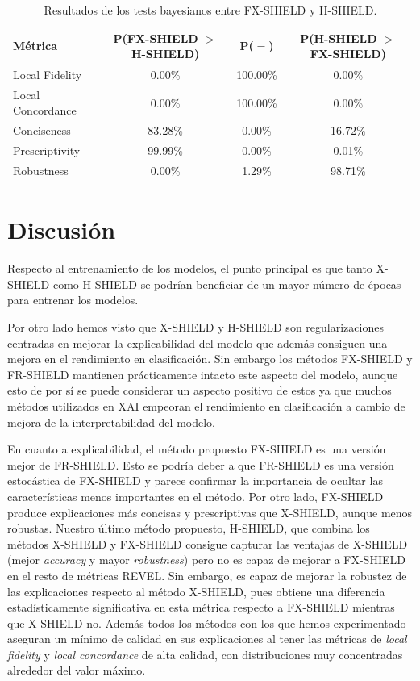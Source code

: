 \begin{table}[ht]
\centering
\begin{tabular}{lccc}
\toprule
\textbf{Métrica} & \textbf{P(FX-SHIELD $>$ H-SHIELD)} & \textbf{P($=$)} & \textbf{P(H-SHIELD $>$ FX-SHIELD)} \\
\midrule
Local Fidelity    & 0.00\%  & 100.00\% & 0.00\%  \\
Local Concordance & 0.00\%  & 100.00\% & 0.00\%  \\
Conciseness       & 83.28\% & 0.00\%  & 16.72\%  \\
Prescriptivity    & 99.99\% & 0.00\%  & 0.01\%  \\
Robustness        & 0.00\% & 1.29\% & 98.71\% \\
\bottomrule
\end{tabular}
\caption{Resultados de los tests bayesianos entre FX-SHIELD y H-SHIELD.}
\label{tab:bay-FX-H}
\end{table}



\section{Discusión} \label{sec:discusion}

Respecto al entrenamiento de los modelos, el punto principal es que tanto X-SHIELD como H-SHIELD se podrían beneficiar de un mayor número de épocas para entrenar los modelos.

Por otro lado hemos visto que X-SHIELD y H-SHIELD son regularizaciones centradas en mejorar la explicabilidad del modelo que además consiguen una mejora en el rendimiento en clasificación. Sin embargo los métodos FX-SHIELD y FR-SHIELD mantienen prácticamente intacto este aspecto del modelo, aunque esto de por sí se puede considerar un aspecto positivo de estos ya que muchos métodos utilizados en XAI empeoran el rendimiento en clasificación a cambio de mejora de la interpretabilidad del modelo.

En cuanto a explicabilidad, el método propuesto FX-SHIELD es una versión mejor de FR-SHIELD. Esto se podría deber a que FR-SHIELD es una versión estocástica de FX-SHIELD y parece confirmar la importancia de ocultar las características menos importantes en el método. Por otro lado, FX-SHIELD produce explicaciones más concisas y prescriptivas que X-SHIELD, aunque menos robustas. Nuestro último método propuesto, H-SHIELD, que combina los métodos X-SHIELD y FX-SHIELD consigue capturar las ventajas de X-SHIELD (mejor \textit{accuracy} y mayor \textit{robustness}) pero no es capaz de mejorar a FX-SHIELD en el resto de métricas REVEL. Sin embargo, es capaz de mejorar la robustez de las explicaciones respecto al método X-SHIELD, pues obtiene una diferencia estadísticamente significativa en esta métrica respecto a FX-SHIELD mientras que X-SHIELD no. Además todos los métodos con los que hemos experimentado aseguran un mínimo de calidad en sus explicaciones al tener las métricas de \textit{local fidelity} y \textit{local concordance} de alta calidad, con distribuciones muy concentradas alrededor del valor máximo.


